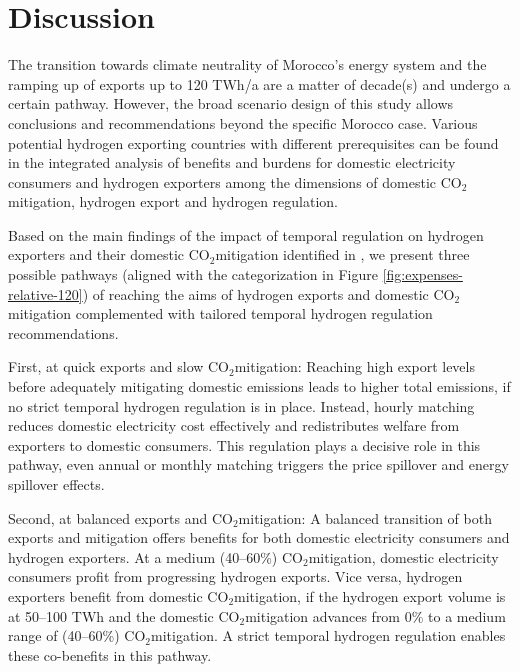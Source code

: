 \documentclass[5p,numafflabel]{elsarticle}
\newcommand{\co}{\ce{CO2}~}
\def\co{CO${}_2${\:}}
\begin{document}
\section*{Discussion}
\label{sec:discussion}



The transition towards climate neutrality of Morocco's energy system and the ramping up of exports up to 120 TWh/a are a matter of decade(s) and undergo a certain pathway. 
However, the broad scenario design of this study allows conclusions and recommendations beyond the specific Morocco case.
Various potential hydrogen exporting countries with different prerequisites can be found in the integrated analysis of benefits and burdens for domestic electricity consumers and hydrogen exporters among the dimensions of domestic \co mitigation, hydrogen export and hydrogen regulation.

Based on the main findings of the impact of temporal regulation on hydrogen exporters and their domestic \co mitigation identified in , we present three possible pathways (aligned with the categorization in Figure \ref{fig:expenses-relative-120}) of reaching the aims of hydrogen exports and domestic \co mitigation complemented with tailored temporal hydrogen regulation recommendations.

First, at quick exports and slow \co mitigation: Reaching high export levels before adequately mitigating domestic emissions leads to higher total emissions, if no strict temporal hydrogen regulation is in place. Instead, hourly matching reduces domestic electricity cost effectively and redistributes welfare from exporters to domestic consumers. This regulation plays a decisive role in this pathway, even annual or monthly matching triggers the price spillover and energy spillover effects.

Second, at balanced exports and \co mitigation: A balanced transition of both exports and mitigation offers benefits for both domestic electricity consumers and hydrogen exporters. At a medium (40--60\%) \co mitigation, domestic electricity consumers profit from progressing hydrogen exports. Vice versa, hydrogen exporters benefit from domestic \co mitigation, if the hydrogen export volume is at 50--100 TWh and the domestic \co mitigation advances from 0\% to a medium range of (40--60\%) \co mitigation. A strict temporal hydrogen regulation enables these co-benefits in this pathway.
\end{document}
